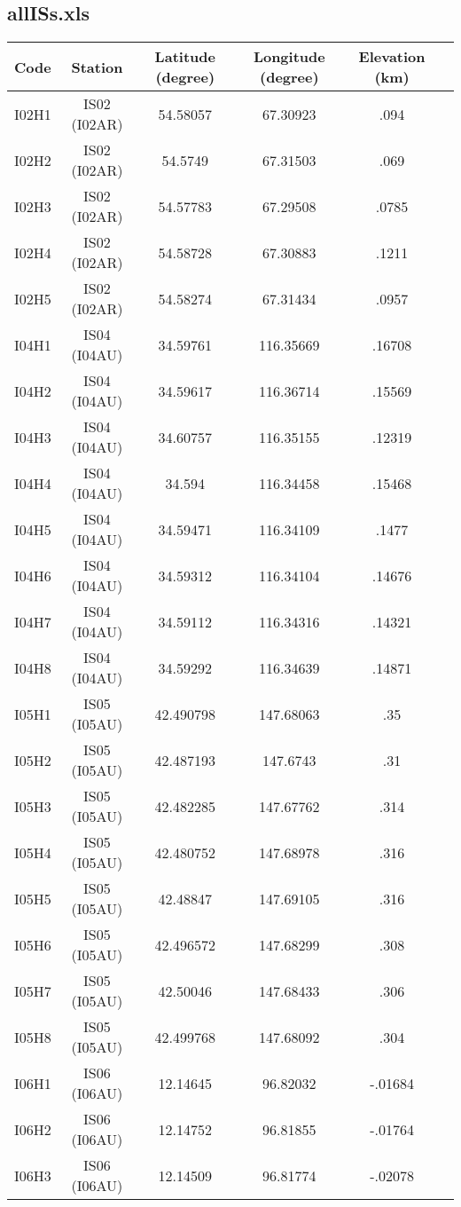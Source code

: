 \documentclass[a4paper, 10pt]{report}
\begin{document}
\subsection{allISs.xls}
{\small
\begin{center}
\begin{tabular}{|c|c|c|c|c|c|}
\hline
Code&	Station&	Latitude (degree)&	Longitude (degree)&	Elevation (km)\\
\hline
I02H1&	IS02 (I02AR)&	 	54.58057&	67.30923&	.094\\
I02H2&	IS02 (I02AR)&	 	54.5749&	67.31503&	.069\\
I02H3&	IS02 (I02AR)&	 	54.57783&	67.29508&	.0785\\
I02H4&	IS02 (I02AR)&	 	54.58728&	67.30883&	.1211\\
I02H5&	IS02 (I02AR)&	 	54.58274&	67.31434&	.0957\\
I04H1&	IS04 (I04AU)&	 	34.59761&	116.35669&	.16708\\
I04H2&	IS04 (I04AU)&	 	34.59617&	116.36714&	.15569\\
I04H3&	IS04 (I04AU)&	 	34.60757&	116.35155&	.12319\\
I04H4&	IS04 (I04AU)&	 	34.594&	116.34458&	.15468\\
I04H5&	IS04 (I04AU)&	 	34.59471&	116.34109&	.1477\\
I04H6&	IS04 (I04AU)&	 	34.59312&	116.34104&	.14676\\
I04H7&	IS04 (I04AU)&	 	34.59112&	116.34316&	.14321\\
I04H8&	IS04 (I04AU)&	 	34.59292&	116.34639&	.14871\\
I05H1&	IS05 (I05AU)&	 	42.490798&	147.68063&	.35\\
I05H2&	IS05 (I05AU)&	 	42.487193&	147.6743&	.31\\
I05H3&	IS05 (I05AU)&	 	42.482285&	147.67762&	.314\\
I05H4&	IS05 (I05AU)&	 	42.480752&	147.68978&	.316\\
I05H5&	IS05 (I05AU)&	 	42.48847&	147.69105&	.316\\
I05H6&	IS05 (I05AU)&	 	42.496572&	147.68299&	.308\\
I05H7&	IS05 (I05AU)&	 	42.50046&	147.68433&	.306\\
I05H8&	IS05 (I05AU)&	 	42.499768&	147.68092&	.304\\
I06H1&	IS06 (I06AU)&	 	12.14645&	96.82032&	-.01684\\
I06H2&	IS06 (I06AU)&	 	12.14752&	96.81855&	-.01764\\
I06H3&	IS06 (I06AU)&	 	12.14509&	96.81774&	-.02078\\

\end{tabular}
\end{center}}
\end{document}
